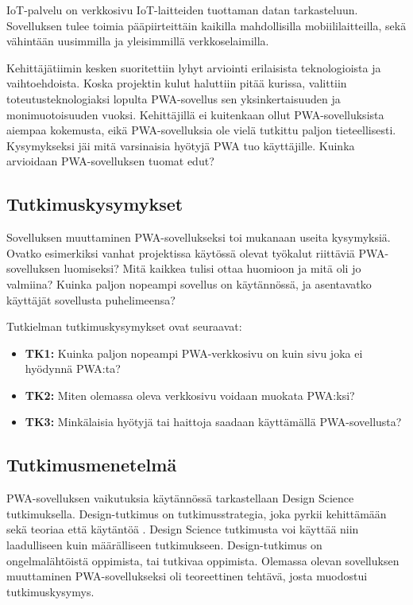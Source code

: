 \documentclass{tktltiki}
\begin{document}
IoT-palvelu on verkkosivu IoT-laitteiden tuottaman datan tarkasteluun. Sovelluksen tulee toimia pääpiirteittäin kaikilla mahdollisilla mobiililaitteilla, sekä vähintään uusimmilla ja yleisimmillä verkkoselaimilla.

Kehittäjätiimin kesken suoritettiin lyhyt arviointi erilaisista teknologioista ja vaihtoehdoista. Koska projektin kulut haluttiin pitää kurissa, valittiin toteutusteknologiaksi lopulta PWA-sovellus sen yksinkertaisuuden ja monimuotoisuuden vuoksi. Kehittäjillä ei kuitenkaan ollut PWA-sovelluksista aiempaa kokemusta, eikä PWA-sovelluksia ole vielä tutkittu paljon tieteellisesti. Kysymykseksi jäi mitä varsinaisia hyötyjä PWA tuo käyttäjille. Kuinka arvioidaan PWA-sovelluksen tuomat edut?

\subsection{Tutkimuskysymykset}

Sovelluksen muuttaminen PWA-sovellukseksi toi mukanaan useita kysymyksiä. Ovatko esimerkiksi vanhat projektissa käytössä olevat työkalut riittäviä PWA-sovelluksen luomiseksi? Mitä kaikkea tulisi ottaa huomioon ja mitä oli jo valmiina? Kuinka paljon nopeampi sovellus on käytännössä, ja asentavatko käyttäjät sovellusta puhelimeensa?

Tutkielman tutkimuskysymykset ovat seuraavat:

\begin{itemize}
  \item \textbf{TK1:} Kuinka paljon nopeampi PWA-verkkosivu on kuin sivu joka ei hyödynnä PWA:ta?
  \item \textbf{TK2:} Miten olemassa oleva verkkosivu voidaan muokata PWA:ksi?
  \item \textbf{TK3:} Minkälaisia hyötyjä tai haittoja saadaan käyttämällä PWA-sovellusta?
\end{itemize}

\subsection{Tutkimusmenetelmä}

PWA-sovelluksen vaikutuksia käytännössä tarkastellaan Design Science tutkimuksella. Design-tutkimus on tutkimusstrategia, joka pyrkii kehittämään sekä teoriaa että käytäntöä \cite{wieringa2010design}. Design Science tutkimusta voi käyttää niin laadulliseen kuin määrälliseen tutkimukseen. Design-tutkimus on ongelmalähtöistä oppimista, tai tutkivaa oppimista. Olemassa olevan sovelluksen muuttaminen PWA-sovellukseksi oli teoreettinen tehtävä, josta muodostui tutkimuskysymys. 
\end{document}
